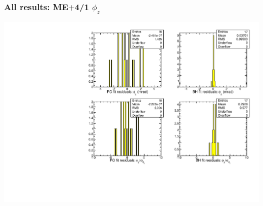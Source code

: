 \documentclass[compress]{beamer}
\begin{document}
\begin{frame}
\frametitle{All results: ME$+$4/1 $\phi_z$}
\includegraphics[width=\linewidth]{newplots_fitresiduals_MEp4_1_phiz.pdf}
\end{frame}
\end{document}
